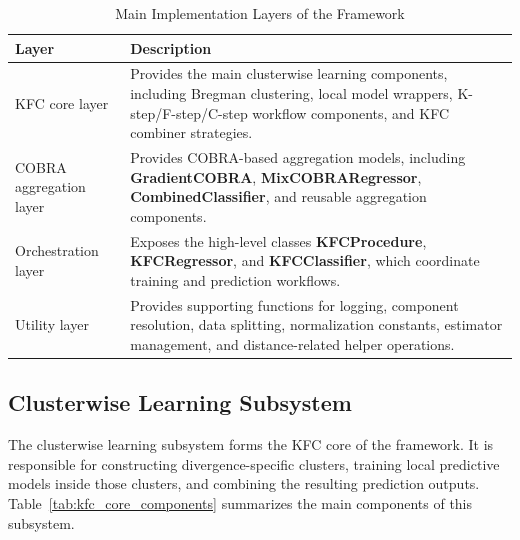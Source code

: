 \begin{table}[H]
      \centering
      \caption{Main Implementation Layers of the Framework}
      \label{tab:implementation_layers}
      \renewcommand{\arraystretch}{1.2}
      \begin{tabularx}{\textwidth}{
                  >{\raggedright\arraybackslash}p{3.5cm}
                  >{\raggedright\arraybackslash}X
            }
            \toprule
            \textbf{Layer}          & \textbf{Description}                                                                                                                                \\
            \midrule
            KFC core layer          &
            Provides the main clusterwise learning components, including Bregman clustering, local model wrappers, K-step/F-step/C-step workflow components, and KFC combiner strategies. \\

            COBRA aggregation layer &
            Provides COBRA-based aggregation models, including \textbf{GradientCOBRA}, \textbf{MixCOBRARegressor}, \textbf{CombinedClassifier}, and reusable aggregation components.      \\

            Orchestration layer     &
            Exposes the high-level classes \textbf{KFCProcedure}, \textbf{KFCRegressor}, and \textbf{KFCClassifier}, which coordinate training and prediction workflows.                  \\

            Utility layer           &
            Provides supporting functions for logging, component resolution, data splitting, normalization constants, estimator management, and distance-related helper operations.       \\
            \bottomrule
      \end{tabularx}


\end{table}

\subsection{Clusterwise Learning Subsystem}

\hs The clusterwise learning subsystem forms the KFC core of the framework. It is responsible for constructing divergence-specific clusters, training local predictive models inside those clusters, and combining the resulting prediction outputs. Table~\ref{tab:kfc_core_components} summarizes the main components of this subsystem.


